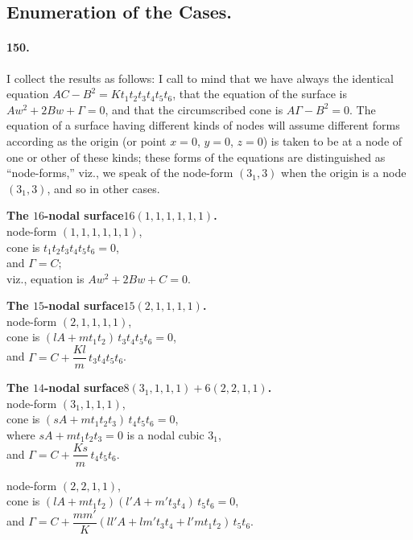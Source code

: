 \documentclass[11pt,a4paper]{article}
\begin{document}
\subsection*{Enumeration of the Cases.}

\paragraph{150.}
I collect the results as follows: I call to mind that we have always the
identical equation $AC - B^2 = K t_1 t_2 t_3 t_4 t_5 t_6$, that the
equation of the surface is $Aw^2 + 2Bw + \Gamma = 0$, and that the
circumscribed cone is $A\Gamma - B^2 = 0$. The equation of a surface
having different kinds of nodes will assume different forms according as
the origin (or point $x = 0$, $y = 0$, $z = 0$) is taken to be at a node
of one or other of these kinds; these forms of the equations are
distinguished as ``node-forms,'' viz., we speak of the node-form
$(3_1, 3)$ when the origin is a node $(3_1, 3)$, and so in other cases.

\medskip
\noindent\textbf{The $16$-nodal surface\quad $16(1, 1, 1, 1, 1, 1)$.}\\
node-form $(1, 1, 1, 1, 1, 1)$,\\
cone is $t_1 t_2 t_3 t_4 t_5 t_6 = 0$,\\
and $\Gamma = C$;\\
viz., equation is $Aw^2 + 2Bw + C = 0$.

\medskip
\noindent\textbf{The $15$-nodal surface\quad $15(2, 1, 1, 1, 1)$.}\\
node-form $(2, 1, 1, 1, 1)$,\\
cone is $(lA + m t_1 t_2)\, t_3 t_4 t_5 t_6 = 0$,\\
and $\Gamma = C + \dfrac{K l}{m}\, t_3 t_4 t_5 t_6$.

\medskip
\noindent\textbf{The $14$-nodal surface\quad $8(3_1, 1, 1, 1) + 6(2, 2, 1, 1)$.}\\
node-form $(3_1, 1, 1, 1)$,\\
cone is $(sA + m t_1 t_2 t_3)\, t_4 t_5 t_6 = 0$,\\
where $sA + m t_1 t_2 t_3 = 0$ is a nodal cubic $3_1$,\\
and $\Gamma = C + \dfrac{K s}{m}\, t_4 t_5 t_6$.

\medskip
\noindent node-form $(2, 2, 1, 1)$,\\
cone is $(lA + m t_1 t_2)(l'A + m' t_3 t_4)\, t_5 t_6 = 0$,\\
and $\Gamma = C + \dfrac{m m'}{K}(l l' A + l m' t_3 t_4 + l' m t_1 t_2)\, t_5 t_6$.
\end{document}
